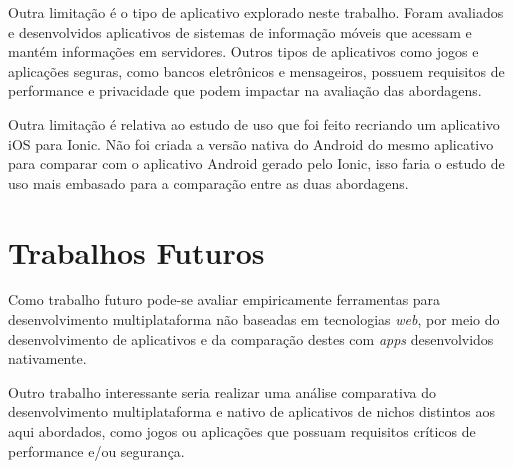 Outra limitação é o tipo de aplicativo explorado neste trabalho. Foram avaliados e desenvolvidos aplicativos de sistemas de informação móveis que acessam e mantém informações em servidores. 
Outros tipos de aplicativos como jogos e aplicações seguras, como bancos eletrônicos e mensageiros, possuem requisitos de performance e privacidade que podem impactar na avaliação das abordagens.

Outra limitação é relativa ao estudo de uso que foi feito recriando um aplicativo iOS para Ionic. Não foi criada a versão nativa do Android do mesmo aplicativo para comparar com o aplicativo Android gerado pelo Ionic, isso 
faria o estudo de uso mais embasado para a comparação entre as duas abordagens.

\section{Trabalhos Futuros} \label{section:trabalhosfuturos}
Como trabalho futuro pode-se avaliar empiricamente ferramentas para desenvolvimento multiplataforma não baseadas em tecnologias 
\textit{web}, por meio do desenvolvimento de aplicativos e da comparação destes com \textit{apps} desenvolvidos nativamente. 

Outro trabalho interessante seria realizar uma análise comparativa do desenvolvimento multiplataforma e nativo de aplicativos de 
nichos distintos aos aqui abordados, como jogos ou aplicações que possuam requisitos críticos de performance e/ou segurança.
